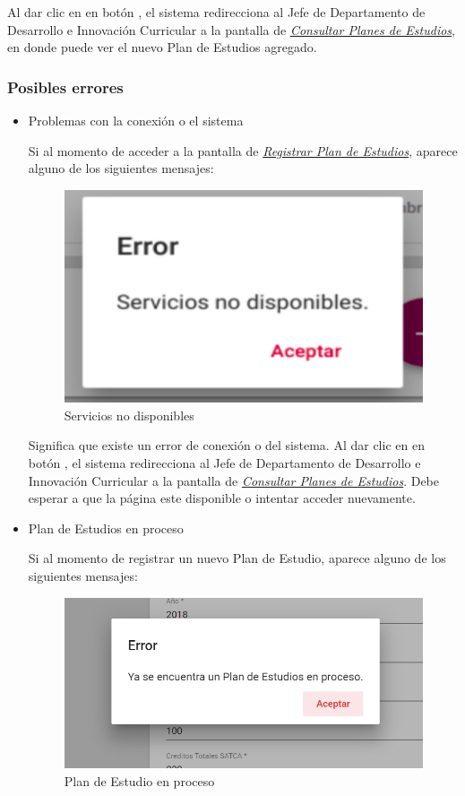Al dar clic en en botón , el sistema redirecciona  al Jefe de Departamento de Desarrollo e Innovación Curricular a la pantalla de \hyperlink{consultarPE}{\textit{Consultar Planes de Estudios}}, en donde puede ver el nuevo Plan de Estudios agregado.\\
\newpage
\subsubsection{Posibles errores}
\begin{itemize}

	\item Problemas con la conexión o el sistema

	Si al momento de acceder a la pantalla de \hyperlink{registrarPE}{\textit{Registrar Plan de Estudios}}, aparece alguno de los siguientes mensajes:
		\begin{figure}[H]
		\centering
		\hypertarget{error}{\includegraphics[width=0.7\linewidth]{images/SP4-GPE/error}}
		\caption{Servicios no disponibles}
		\label{error}
		\end{figure}


	Significa que existe un error de conexión o del sistema. Al dar clic en en botón , el sistema redirecciona al Jefe de Departamento de Desarrollo e Innovación Curricular a la pantalla de \hyperlink{consultarPE}{\textit{Consultar Planes de Estudios}}. Debe esperar a que la página este disponible o intentar acceder nuevamente.
	\newpage
	\item Plan de Estudios en proceso

	Si al momento de registrar un nuevo Plan de Estudio, aparece alguno de los siguientes mensajes:
	\begin{figure}[H]
		\centering
		\hypertarget{error1}{\includegraphics[width=0.7\linewidth]{images/SP4-GPE/error1}}
		\caption{Plan de Estudio en proceso}
		\label{error1}
	\end{figure}



\end{itemize}
